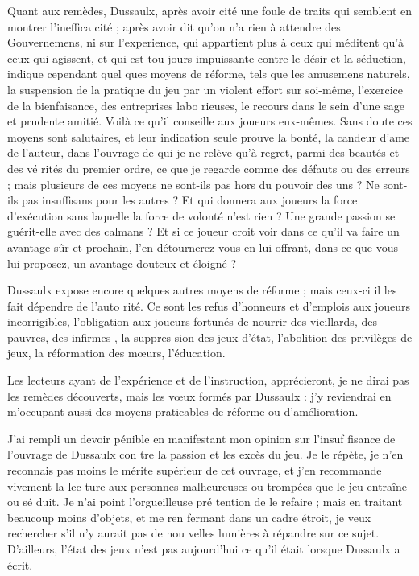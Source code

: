 Quant aux remèdes, Dussaulx,
après avoir cité une foule de traits
qui semblent en montrer l'ineffica%
cité ; après avoir dit qu'on n'a rien à
attendre des Gouvernemens,  ni sur l'experience, qui
appartient plus à ceux qui méditent
qu'à ceux qui agissent, et qui est tou%
jours impuissante contre le désir et la
séduction, indique cependant quel%
ques moyens de réforme, tels que les
amusemens naturels, la suspension
de la pratique du jeu par un violent
effort sur soi-même, l'exercice de la
bienfaisance, des entreprises labo%
rieuses, le recours dans le sein d'une
sage et prudente amitié. Voilà ce qu'il
conseille aux joueurs eux-mêmes.
Sans doute ces moyens sont salutaires,
et leur indication seule prouve la
bonté, la candeur d'ame de l'auteur,
dans l'ouvrage de qui je ne relève qu'à
regret, parmi des beautés et des vé%
rités du premier ordre, ce que je
regarde comme des défauts ou des
erreurs ; mais plusieurs de ces moyens
ne sont-ils pas hors du pouvoir des
uns ? Ne sont-ils pas insuffisans pour
les autres ? Et qui donnera aux joueurs
la force d'exécution sans laquelle la
force de volonté n'est rien ? Une
grande passion se guérit-elle avec des
calmans ? Et si ce joueur croit voir
dans ce qu'il va faire un avantage sûr
et prochain, l'en détournerez-vous
en lui offrant, dans ce que vous lui
proposez, un avantage douteux et
éloigné ?

Dussaulx expose encore quelques
autres moyens de réforme ; mais
ceux-ci il les fait dépendre de l'auto%
rité. Ce sont les refus d'honneurs et
d'emplois aux joueurs incorrigibles,
l'obligation aux joueurs fortunés de
nourrir des vieillards, des pauvres,
des infirmes , la suppres%
sion des jeux d'état, l'abolition des
privilèges de jeux, la réformation des
mœurs, l'éducation.

Les lecteurs ayant de l'expérience
et de l'instruction, apprécieront, je
ne dirai pas les remèdes découverts,
mais les vœux formés par Dussaulx :
j'y reviendrai en m'occupant aussi
des moyens praticables de réforme
ou d'amélioration.

J'ai rempli un devoir pénible en 
manifestant mon opinion sur l'insuf%
fisance de l'ouvrage de Dussaulx con%
tre la passion et les excès du jeu. Je
le répète, je n'en reconnais pas moins
le mérite supérieur de cet ouvrage,
et j'en recommande vivement la lec%
ture aux personnes malheureuses ou
trompées que le jeu entraîne ou sé%
duit. Je n'ai point l'orgueilleuse pré%
tention de le refaire ; mais en traitant
beaucoup moins d'objets, et me ren%
fermant dans un cadre étroit, je veux
rechercher s'il n'y aurait pas de nou%
velles lumières à répandre sur ce
sujet. D'ailleurs, l'état des jeux n'est
pas aujourd'hui ce qu'il était lorsque
Dussaulx a écrit.
